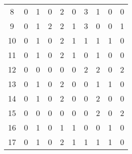\begin{longtable}{cp{1.5cm}p{1.5cm}p{1.5cm}p{1.5cm}p{1.5cm}p{1.5cm}p{1.5cm}p{1.5cm}p{1.5cm}}
8  &                      0 &                      1 &                      0 &                         2 &                         0 &                         3 &                      1 &                      0 &                      0 \\
9  &                      0 &                      1 &                      2 &                         2 &                         1 &                         3 &                      0 &                      0 &                      1 \\
10 &                      0 &                      1 &                      0 &                         2 &                         1 &                         1 &                      1 &                      1 &                      0 \\
11 &                      0 &                      1 &                      0 &                         2 &                         1 &                         0 &                      1 &                      0 &                      0 \\
12 &                      0 &                      0 &                      0 &                         0 &                         0 &                         2 &                      2 &                      0 &                      2 \\
13 &                      0 &                      1 &                      0 &                         2 &                         0 &                         0 &                      1 &                      1 &                      0 \\
14 &                      0 &                      1 &                      0 &                         2 &                         0 &                         0 &                      2 &                      0 &                      0 \\
15 &                      0 &                      0 &                      0 &                         0 &                         0 &                         0 &                      2 &                      0 &                      2 \\
16 &                      0 &                      1 &                      0 &                         1 &                         1 &                         0 &                      0 &                      1 &                      0 \\
17 &                      0 &                      1 &                      0 &                         2 &                         1 &                         1 &                      1 &                      1 &                      0 \\

\end{longtable}
